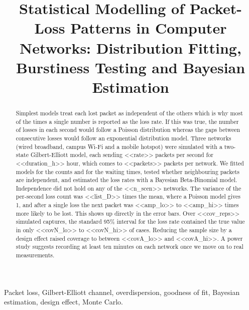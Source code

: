 \documentclass[conference]{IEEEtran}
\begin{document}
\title{Statistical Modelling of Packet-Loss Patterns in Computer Networks: Distribution Fitting, Burstiness Testing and Bayesian Estimation}

\author{
\and
{}
\and
{}}

\maketitle

\begin{abstract}
Simplest models treat each lost packet as independent of the others which is why most of the times a single number is reported as the loss rate. If this was true, the number of losses in each second would follow a Poisson distribution whereas the gaps between consecutive losses would follow an exponential distribution model. Three networks (wired broadband, campus Wi-Fi and a mobile hotspot) were simulated with a two-state Gilbert-Elliott model, each sending <<rate>> packets per second for <<duration_h>> hour, which comes to <<packets>> packets per network. We fitted models for the counts and for the waiting times, tested whether neighbouring packets are independent, and estimated the loss rates with a Bayesian Beta-Binomial model. Independence did not hold on any of the <<n_scen>> networks. The variance of the per-second loss count was <<list_D>> times the mean, where a Poisson model gives 1, and after a single loss the next packet was <<amp_lo>> to <<amp_hi>> times more likely to be lost. This shows up directly in the error bars. Over <<cov_reps>> simulated captures, the standard 95\% interval for the loss rate contained the true value in only <<covN_lo>> to <<covN_hi>> of cases. Reducing the sample size by a design effect raised coverage to between <<covA_lo>> and <<covA_hi>>. A power study suggests recording at least ten minutes on each network once we move on to real measurements.
\end{abstract}

\begin{IEEEkeywords}
Packet loss, Gilbert-Elliott channel, overdispersion, goodness of fit, Bayesian estimation, design effect, Monte Carlo.
\end{IEEEkeywords}
\end{document}

